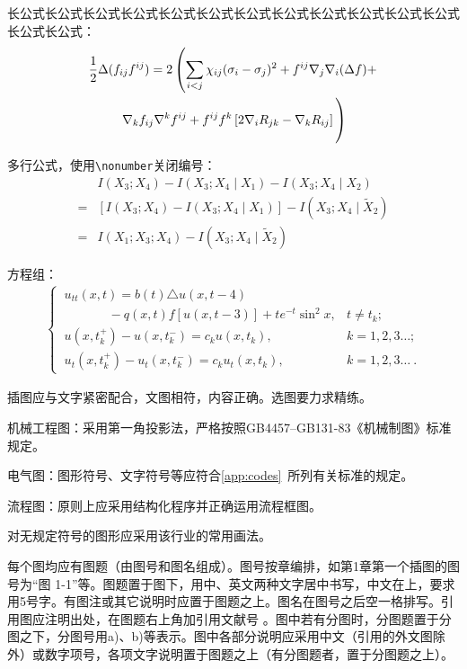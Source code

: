 长公式长公式长公式长公式长公式长公式长公式长公式长公式长公式长公式长公式长公式长公式：
\begin{multline}\label{eq:long}
\frac{1}{2}\Delta(f_{ij}f^{ij})=
2\left(\sum_{i<j}\chi_{ij}(\sigma_i-\sigma_j)^2+f^{ij}\nabla_j\nabla_i(\Delta f)+\right .\\
\left .\nabla_kf_{ij}\nabla^kf^{ij}+f^{ij}f^k\left[2\nabla_iR_{jk}-\nabla_kR_{ij}\right]\vphantom{\sum_{i<j}}\right)
\end{multline}

多行公式，使用\verb|\nonumber|关闭编号：
\begin{align}
&I(X_3;X_4)-I(X_3;X_4\mid{}X_1)-I(X_3;X_4\mid{}X_2)\nonumber\\
=&[I(X_3;X_4)-I(X_3;X_4\mid{}X_1)]-I(X_3;X_4\mid{}\tilde{X}_2)\\
=&I(X_1;X_3;X_4)-I(X_3;X_4\mid{}\tilde{X}_2)
\end{align}

方程组：
\begin{align}
\begin{cases}
\ u_{tt}(x,t)= b(t)\triangle u(x,t-4)&\\
\ \hspace{42pt}- q(x,t)f[u(x,t-3)]+te^{-t}\sin^2 x,  &  t \neq t_k; \\
\ u(x,t_k^+) - u(x,t_k^-) = c_k u(x,t_k), & k=1,2,3\ldots ;\\
\ u_{t}(x,t_k^+) - u_{t}(x,t_k^-) =c_k u_{t}(x,t_k), &
k=1,2,3\ldots\ .
\end{cases}
\end{align}

插图应与文字紧密配合，文图相符，内容正确。选图要力求精练。

机械工程图：采用第一角投影法，严格按照GB4457--GB131-83《机械制图》标准规定。

电气图：图形符号、文字符号等应符合\cref{app:codes}~所列有关标准的规定。

流程图：原则上应采用结构化程序并正确运用流程框图。

对无规定符号的图形应采用该行业的常用画法。

每个图均应有图题（由图号和图名组成）。图号按章编排，如第1章第一个插图的图号为“图 1-1”等。图题置于图下，用中、英文两种文字居中书写，中文在上，要求用5号字。有图注或其它说明时应置于图题之上。图名在图号之后空一格排写。引用图应注明出处，在图题右上角加引用文献号 。图中若有分图时，分图题置于分图之下，分图号用a)、b)等表示。图中各部分说明应采用中文（引用的外文图除外）或数字项号，各项文字说明置于图题之上（有分图题者，置于分图题之上）。

